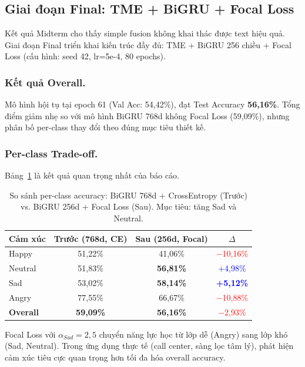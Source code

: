 \documentclass[runningheads]{llncs}
\begin{document}
\subsection{Giai đoạn Final: TME + BiGRU + Focal Loss}
\label{sec:final}

Kết quả Midterm cho thấy simple fusion không khai thác được text hiệu quả.
Giai đoạn Final triển khai kiến trúc đầy đủ: TME + BiGRU 256 chiều + Focal
Loss (cấu hình: seed 42, lr=5e-4, 80 epochs).

\subsubsection{Kết quả Overall.}
Mô hình hội tụ tại epoch 61 (Val Acc: 54,42\%), đạt Test Accuracy
\textbf{56,16\%}.
Tổng điểm giảm nhẹ so với mô hình BiGRU 768d không Focal Loss (59,09\%),
nhưng phân bố per-class thay đổi theo đúng mục tiêu thiết kế.

\subsubsection{Per-class Trade-off.}
Bảng~\ref{tab:final_results} là kết quả quan trọng nhất của báo cáo.

\begin{table}[H]
\centering
\caption{So sánh per-class accuracy: BiGRU 768d + CrossEntropy (Trước) vs.
BiGRU 256d + Focal Loss (Sau). Mục tiêu: tăng Sad và Neutral.}
\label{tab:final_results}
\begin{tabular}{@{}lccc@{}}
\toprule
\textbf{Cảm xúc} & \textbf{Trước (768d, CE)} & \textbf{Sau (256d, Focal)} & \textbf{$\Delta$} \\
\midrule
Happy   & 51,22\% & 41,06\% & \textcolor{red}{$-$10,16\%} \\
Neutral & 51,83\% & \textbf{56,81\%} & \textcolor{blue}{+4,98\%} \\
Sad     & 53,02\% & \textbf{58,14\%} & \textcolor{blue}{\textbf{+5,12\%}} \\
Angry   & 77,55\% & 66,67\% & \textcolor{red}{$-$10,88\%} \\
\midrule
\textbf{Overall} & \textbf{59,09\%} & \textbf{56,16\%} & \textcolor{red}{$-$2,93\%} \\
\bottomrule
\end{tabular}
\end{table}

Focal Loss với $\alpha_{Sad}{=}2{,}5$ chuyển năng lực học từ lớp dễ (Angry)
sang lớp khó (Sad, Neutral).
Trong ứng dụng thực tế (call center, sàng lọc tâm lý), phát hiện cảm xúc
tiêu cực quan trọng hơn tối đa hóa overall accuracy.
\end{document}

